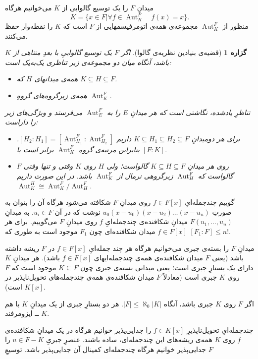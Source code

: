 \documentclass[12pt,a4paper]{report}
\theoremstyle{colorhead}
\newtheorem{prop}[thm]{گزاره}
\DeclareMathOperator{\Aut}{Aut}
\begin{document}
میدانِ
$F$
را یک توسیع گالوایی از
$K$
می‌خوانیم هرگاه
\[
K=\{x\in F|\forall f\in \Aut_K^F \quad f(x)=x\}.
\]
منظور از
$\Aut^F_K$
مجموعه‌ی همه‌ی اتومرفیسمهایی از
$F$
است که
$K$
را نقطه‌وار حفظ می‌کنند.
\begin{prop}[قضیه‌ی بنیادین نظریه‌ی گالوا]
اگر
$F$
یک توسیع گالواییِ با بعدِ متناهی از
$K$
باشد، آنگاه میان دو مجموعه‌ی زیر تناظری یک‌به‌یک است:
\begin{itemize}
\item 
همه‌ی میدانهای $H$ که
$K\subseteq H\subseteq F$.
\item 
همه‌ی زیرگروه‌های گروهِ
$\Aut^F_K$.
\end{itemize}
تناظرِ یادشده، نگاشتی است که هر
میدانِ
$E$
را به
$\Aut^F_E$
می‌فرستد و ویژگی‌های زیر را داراست:
\begin{itemize}
\item 
برای هر دومیدانِ
$K\subseteq H_1\subseteq H_2\subseteq F$
داریم
$[H_2:H_1]=[\Aut^F_{H_1}:\Aut^F_{H_2}]$.
بنابراین مرتبه‌ی
گروه
$\Aut^F_K$
برابر است با
$[F:K]$.
\item 
$F$
روی هر میدانِ
$K\subseteq H\subseteq F$
گالواست؛ ولی
$H$
روی
$K$
وقتی و تنها وقتی گالواست که 
$\Aut^F_H$
زیرگروهی نرمال از
$\Aut^F_K$
باشد. در این صورت داریم
$\Aut^H_K\cong \Aut^F_K/\Aut^F_H$.
\end{itemize}
\end{prop}
گوییم چندجمله‌ایِ
$f\in F[x]$
روی میدانِ
$F$
شکافته می‌شود
هرگاه آن را بتوان به صورتِ
$u_0(x-u_0)(x-u_2)\ldots (x-u_n)$
نوشت که در آن
$u_i\in F$.
به میدانِ
$F(u_1,\ldots, u_n)$
میدانِ شکافنده‌ی 
چندجمله‌ایِ
$f$
روی میدانِ
$F$
می‌گوییم. برای هر
$f\in F[x]$
میدان شکافنده‌ای چون
$F_1$
موجود است به طوری که
$[F_1:F]\leq n!$.
\par 
میدانِ
$F$
را بسته‌ی جبری می‌خوانیم هرگاه هر چند جمله‌ایِ
$f\in F[x]$
در
$F$
ریشه داشته باشد (یعنی
$F$
میدان شکافنده‌ی همه‌ی چندجمله‌ایهای
$f\in F[x]$
باشد).  هر میدانِ
$K$
دارای یک بستارِ جبری است؛ یعنی میدانی بسته‌ی جبری
چون
$K\subseteq F$
موجود است که $F$
روی
$K$
جبری است  (معادلاً
$F$
میدان شکافنده‌ی همه‌ی چندجمله‌های تحویل‌ناپذیر در
$K[x]$
است).
\par 
اگر
$F$
روی
$K$
جبری باشد، آنگاه
$|F|\leq \aleph_0|K|$.
هر دو بستارِ جبری از یک میدانِ 
$K$
با هم
 $K$
 ــ
ایزومرفند. 
\par 
چندجمله‌ایِ تحویل‌ناپذیرِ
$f\in K[x]$
را جدایی‌پذیر
خوانیم هرگاه در یک میدانِ شکافنده‌ی
$f$
روی
$K$
همه‌ی ریشه‌های 
این چندجمله‌ای، ساده باشند. عنصرِ جبریِ
$u\in F-K$
را جدایی‌پذیر خوانیم هرگاه چندجمله‌ای کمینال آن جدایی‌پذیر باشد. توسیعِ
$F$
\end{document}
